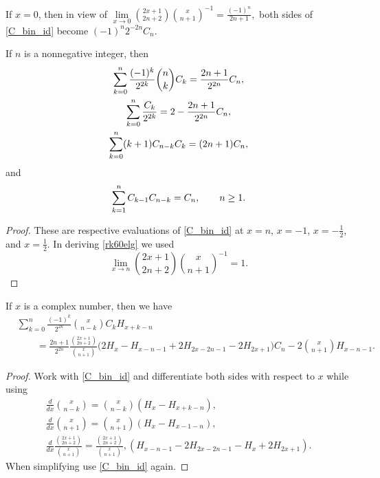 \documentclass[12pt,reqno]{article}
\begin{document}
\begin{remark}
	If $x=0$, then in view of 
	$\lim\limits_{x\rightarrow 0} {\binom{2x+1}{2n+2}}{\binom{x}{n+1}}^{-1} = \frac{(-1)^n}{2n+1},$
	both sides of \eqref{C_bin_id} become $(-1)^n 2^{-2n} C_n$.
\end{remark}
\begin{corollary}
If $n$ is a nonnegative integer, then
	\begin{gather}
	\sum_{k = 0}^n \frac{( - 1)^k}{2^{2k}} \binom{{n}}{k} C_k = \frac{2n + 1}{2^{2n}} C_n \label{rk60elg}, \\ 
	\sum_{k = 0}^n \frac{ C_k}{2^{2k}} =  2-\frac{2n + 1}{2^{2n}}C_n ,\notag\\
	\sum_{k = 0}^n (k+1) C_{n - k} C_k = (2n+1)C_n,\notag
	\end{gather}
and 
\begin{equation}
\sum_{k = 1}^n C_{k-1}C_{n-k} = C_n,\qquad n\geq1.\notag
\end{equation}
\end{corollary}
\begin{proof} These are respective evaluations of \eqref{C_bin_id} at $x=n$, $x=-1$, $x=-\frac12$, and $x=\frac12$. In deriving \eqref{rk60elg} we used
	\begin{equation}\label{vmrppnb}
	\lim_{x\to n}\binom{{2x + 1}}{{2n + 2}}\binom{{x}}{{n + 1}}^{ - 1} = 1.
	\end{equation}
\end{proof}
\begin{theorem}
	If $x$ is a complex number, then we have
	\begin{align}\label{CH_bin_id}
	&\sum_{k=0}^n \frac{(-1)^k}{2^{2k}}\binom{x}{n-k}  C_k H_{x+k-n}  \nonumber \\
	&\qquad= \frac{2n+1}{2^{2n}} \frac{\binom{2x+1}{2n+2}}{\binom{x}{n+1}} \big ( 2H_x - H_{x-n-1} +2 H_{2x-2n-1} - 2H_{2x+1}\big )C_n 
	- 2 \binom{x}{n+1} H_{x-n-1}.  
	\end{align}
\end{theorem}
\begin{proof}
	Work with \eqref{C_bin_id} and differentiate both sides with respect to $x$ while using
	\begin{gather*}
	\frac{d}{dx} \binom{x}{n-k} = \binom{x}{n-k} (H_x - H_{x+k-n}  ), \\
	\frac{d}{dx} \binom{x}{n+1} = \binom{x}{n+1} (H_x - H_{x-1-n}  ), \\
	\frac{d}{dx} \frac{\binom{2x+1}{2n+2}}{\binom{x}{n+1}} = \frac{\binom{2x+1}{2n+2}}{\binom{x}{n+1}},(H_{x-n-1} - 2H_{2x-2n-1} 
	- H_x +2H_{2x+1}).
	\end{gather*}
	When simplifying use \eqref{C_bin_id} again.
\end{proof}
\end{document}
